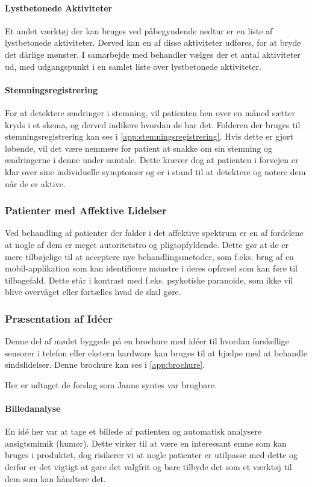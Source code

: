 \paragraph{Lystbetonede Aktiviteter}
Et andet værktøj der kan bruges ved påbegyndende nedtur er en liste af lystbetonede aktiviteter.
Derved kan en af disse aktiviteter udføres, for at bryde det dårlige mønster.
I samarbejde med behandler vælges der et antal aktiviteter ud, med udgangspunkt i en samlet liste over lystbetonede aktiviteter.

\paragraph{Stemningsregistrering}
For at detektere ændringer i stemning, vil patienten hen over en måned sætter kryds i et skema, og derved indikere hvordan de har det.
Folderen der bruges til stemningsregistrering kan ses i \cref{app:stemningsregistrering}.
Hvis dette er gjort løbende, vil det være nemmere for patient at snakke om sin stemning og ændringerne i denne under samtale.
Dette kræver dog at patienten i forvejen er klar over sine individuelle symptomer og er i stand til at detektere og notere dem når de er aktive.

\subsubsection{Patienter med Affektive Lidelser}
Ved behandling af patienter der falder i det affektive spektrum er en af fordelene at nogle af dem er meget autoritetstro og pligtopfyldende.
Dette gør at de er mere tilbøjelige til at acceptere nye behandlingsmetoder, som f.eks. brug af en mobil-applikation som kan identificere mønstre i deres opførsel som kan føre til tilbagefald.
Dette står i kontrast med f.eks. psykotiske paranoide, som ikke vil blive overvåget eller fortælles hvad de skal gøre.

\subsubsection{Præsentation af Idéer}\label{janne_ideer}
Denne del af mødet byggede på en brochure med idéer til hvordan forskellige sensorer i telefon eller ekstern hardware kan bruges til at hjælpe med at behandle sindslidelser. 
Denne brochure kan ses i \cref{app:brochure}.

Her er udtaget de forslag som Janne syntes var brugbare.

\paragraph{Billedanalyse}
En idé her var at tage et billede af patienten og automatisk analysere ansigtsmimik (humør).
Dette virker til at være en interessant emne som kan bruges i produktet, dog risikerer vi at nogle patienter er utilpasse med dette og derfor er det vigtigt at gøre det valgfrit og bare tilbyde det som et værktøj til dem som kan håndtere det.

